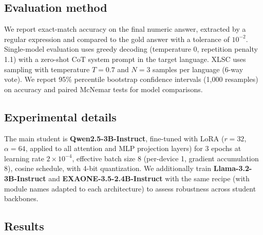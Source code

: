 \documentclass{article}
\begin{document}
\subsection{Evaluation method}
We report exact-match accuracy on the final numeric answer, extracted
by a regular expression and compared to the gold answer with a
tolerance of $10^{-2}$. Single-model evaluation uses greedy decoding
(temperature 0, repetition penalty 1.1) with a zero-shot CoT system
prompt in the target language. XLSC uses sampling with temperature
$T=0.7$ and $N=3$ samples per language (6-way vote). We report 95\%
percentile bootstrap confidence intervals (1,000 resamples) on
accuracy and paired McNemar tests for model comparisons.

\subsection{Experimental details}
The main student is \textbf{Qwen2.5-3B-Instruct}, fine-tuned with
LoRA ($r=32$, $\alpha=64$, applied to all attention and MLP
projection layers) for 3 epochs at learning rate $2\times 10^{-4}$,
effective batch size 8 (per-device 1, gradient accumulation 8),
cosine schedule, with 4-bit quantization. We additionally train
\textbf{Llama-3.2-3B-Instruct} and \textbf{EXAONE-3.5-2.4B-Instruct}
with the same recipe (with module names adapted to each architecture)
to assess robustness across student backbones.

\subsection{Results}
\label{sec:results}
\end{document}
